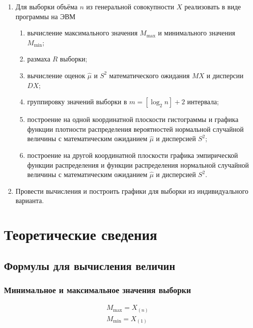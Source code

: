 \documentclass[12pt]{report}
\begin{document}
\begin{enumerate}
    \item Для выборки объёма $n$ из генеральной совокупности $X$ реализовать в виде программы на ЭВМ
        \begin{enumerate}
            \item вычисление максимального значения $M_{\max}$ и минимального значения $M_{\min}$;
            \item размаха $R$ выборки;
            \item вычисление оценок $\hat\mu$ и $S^2$ математического ожидания $MX$ и дисперсии $DX$;
            \item группировку значений выборки в $m = [\log_2 n] + 2$ интервала;
            \item построение на одной координатной плоскости гистограммы и графика функции плотности распределения вероятностей нормальной случайной величины с математическим ожиданием $\hat{\mu}$ и дисперсией $S^2$;
            \item построение на другой координатной плоскости графика эмпирической функции распределения и функции распределения нормальной случайной величины с математическим ожиданием $\hat{\mu}$ и дисперсией $S^2$.
        \end{enumerate}
    \item Провести вычисления и построить графики для выборки из индивидуального варианта.
\end{enumerate}

\section{Теоретические сведения}

\subsection{Формулы для вычисления величин}

\subsubsection{Минимальное и максимальное значения выборки}
\begin{equation}
    \begin{aligned}
        M_{\max} = X_{(n)}\\
        M_{\min} = X_{(1)}
    \end{aligned}
\end{equation}
\end{document}
